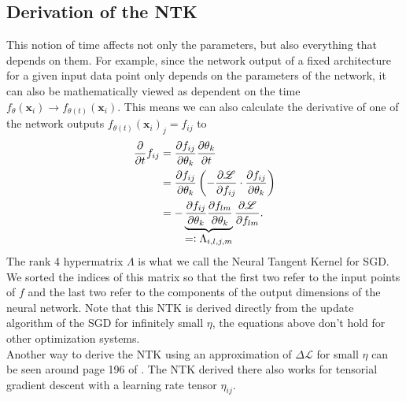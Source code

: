 \subsection{Derivation of the NTK}
This notion of time affects not only the parameters, but also everything that depends on them. For example, since the network output of a fixed architecture for a given input data point only depends on the parameters of the network, it can also be mathematically viewed as dependent on the time $f_{\theta}(\mathbf{x}_i) \rightarrow f_{\theta(t)}(\mathbf{x}_i)$. This means we can also calculate the derivative of one of the network outputs $f_{\theta(t)}(\mathbf{x}_i)_j = f_{ij}$ to
\begin{align}
	\pAbl{}{t} f_{ij} &= \pAbl{f_{ij}}{\theta_k}\pAbl{\theta_k}{t}\nonumber\\
	&= \pAbl{f_{ij}}{\theta_k} \left(- \pAbl{\mathscr{L}}{f_{ij}} \cdot \pAbl{f_{ij}}{\theta_k} \right)\label{eq:NTKarisesFromHere}\\
	&= - \underbrace{\pAbl{f_{ij}}{\theta_k} \pAbl{f_{lm}}{\theta_k}}_\mathlarger{=\vcentcolon \Lambda_{i,l,j,m}}
	\pAbl{\mathscr{L}}{f_{lm}}.\nonumber
\end{align}
The rank 4 hypermatrix $\Lambda$ is what we call the Neural Tangent Kernel for SGD. We sorted the indices of this matrix so that the first two refer to the input points of $f$ and the last two refer to the components of the output dimensions of the neural network. Note that this NTK is derived directly from the update algorithm of the SGD for infinitely small $\eta$, the equations above don't hold for other optimization systems.\\
Another way to derive the NTK using an approximation of $\Delta \mathscr{L}$ for small $\eta$ can be seen around page 196 of \cite{ThePrinciplesOfDeepLearningTheory}. The NTK derived there also works for tensorial gradient descent with a learning rate tensor $\eta_{ij}$.